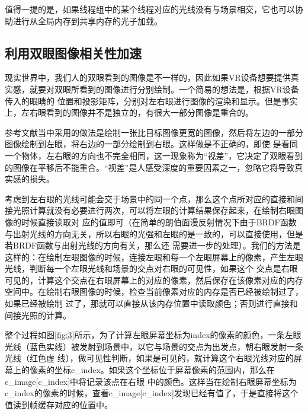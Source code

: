 \documentclass[UTF8]{ctexart}
\begin{document}
        值得一提的是，如果线程组中的某个线程对应的光线没有与场景相交，它也可以协助进行从全局内存到共享内存的光子加载。
    \subsection{利用双眼图像相关性加速}
        现实世界中，我们人的双眼看到的图像是不一样的，因此如果VR设备想要提供真实感，就要对双眼所看到的图像进行分别绘制。一个简易的想法是，根据VR设备传入的眼睛的
        位置和投影矩阵，分别对左右眼进行图像的渲染和显示。但是事实上，左右眼看到的图像并不是独立的，有很大一部分图像是重合的。
        
        参考文献\cite{fujita2014foveated}当中采用的做法是绘制一张比目标图像更宽的图像，然后将左边的一部分图像绘制到左眼，将右边的一部分绘制到右眼。这样做是不正确的，即使
        是看同一个物体，左右眼的方向也不完全相同，这一现象称为“视差”，它决定了双眼看到的图像在平移后不能重合。“视差”是人感受深度的重要因素之一，忽略它将导致真实感的损失。
        
        考虑到左右眼的光线可能会交于场景中的同一个点，那么这个点所对应的直接和间接光照计算就没有必要进行两次，可以将左眼的计算结果保存起来，在绘制右眼图像的时候直接读取对
        应的值即可（在简单的朗伯面漫反射情况下由于BRDF函数与出射光线的方向无关，所以右眼的光强和左眼的是一致的，可以直接使用，但是若BRDF函数与出射光线的方向有关，那么还
        需要进一步的处理）。我们的方法是这样的：在绘制左眼图像的时候，连接左眼和每一个左眼屏幕上的像素，产生左眼光线，判断每一个左眼光线和场景的交点对右眼的可见性，如果这个
        交点是右眼可见的，计算这个交点在右眼屏幕上的对应的像素，然后保存在该像素对应的内存空间中。在绘制右眼图像的时候，检查当前像素对应的内存是否已经被绘制过了，如果已经被绘制
        过了，那就可以直接从该内存位置中读取颜色；否则进行直接和间接光照的计算。
        
        整个过程如图\ref{fig:3}所示，为了计算左眼屏幕坐标为index的像素的颜色，一条左眼光线（蓝色实线）被发射到场景中，以它与场景的交点为出发点，朝右眼发射一条光线（红色虚
        线），做可见性判断，如果是可见的，就计算这个右眼光线对应的屏幕上的像素的坐标c\_index。如果这个坐标位于屏幕像素的范围内，那么在c\_image[c\_index]中将记录该点在右眼
        中的颜色。这样当在绘制右眼屏幕坐标为c\_index的像素的时候，查看c\_image[c\_index]发现已经有值了，于是直接将这个值读到帧缓存对应的位置中。
        
\end{document}
